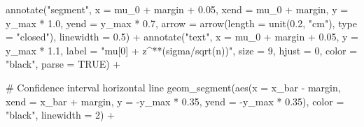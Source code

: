 \documentclass[
  letterpaper,
  DIV=11,
  numbers=noendperiod]{scrreprt}
\newenvironment{Shaded}{\begin{snugshade}}{\end{snugshade}}
\newcommand{\AttributeTok}[1]{\textcolor[rgb]{0.40,0.45,0.13}{#1}}
\newcommand{\CommentTok}[1]{\textcolor[rgb]{0.37,0.37,0.37}{#1}}
\newcommand{\ConstantTok}[1]{\textcolor[rgb]{0.56,0.35,0.01}{#1}}
\newcommand{\DecValTok}[1]{\textcolor[rgb]{0.68,0.00,0.00}{#1}}
\newcommand{\FloatTok}[1]{\textcolor[rgb]{0.68,0.00,0.00}{#1}}
\newcommand{\FunctionTok}[1]{\textcolor[rgb]{0.28,0.35,0.67}{#1}}
\newcommand{\NormalTok}[1]{\textcolor[rgb]{0.00,0.23,0.31}{#1}}
\newcommand{\SpecialCharTok}[1]{\textcolor[rgb]{0.37,0.37,0.37}{#1}}
\newcommand{\StringTok}[1]{\textcolor[rgb]{0.13,0.47,0.30}{#1}}
\begin{document}
\begin{Shaded}
\begin{Highlighting}[]
  \FunctionTok{annotate}\NormalTok{(}\StringTok{"segment"}\NormalTok{, }\AttributeTok{x =}\NormalTok{ mu\_0 }\SpecialCharTok{+}\NormalTok{ margin }\SpecialCharTok{+} \FloatTok{0.05}\NormalTok{, }\AttributeTok{xend =}\NormalTok{ mu\_0 }\SpecialCharTok{+}\NormalTok{ margin, }
           \AttributeTok{y =}\NormalTok{ y\_max }\SpecialCharTok{*} \FloatTok{1.0}\NormalTok{, }\AttributeTok{yend =}\NormalTok{ y\_max }\SpecialCharTok{*} \FloatTok{0.7}\NormalTok{,}
           \AttributeTok{arrow =} \FunctionTok{arrow}\NormalTok{(}\AttributeTok{length =} \FunctionTok{unit}\NormalTok{(}\FloatTok{0.2}\NormalTok{, }\StringTok{"cm"}\NormalTok{), }\AttributeTok{type =} \StringTok{"closed"}\NormalTok{),}
           \AttributeTok{linewidth =} \FloatTok{0.5}\NormalTok{) }\SpecialCharTok{+}
  \FunctionTok{annotate}\NormalTok{(}\StringTok{"text"}\NormalTok{, }\AttributeTok{x =}\NormalTok{ mu\_0 }\SpecialCharTok{+}\NormalTok{ margin }\SpecialCharTok{+} \FloatTok{0.05}\NormalTok{, }\AttributeTok{y =}\NormalTok{ y\_max }\SpecialCharTok{*} \FloatTok{1.1}\NormalTok{, }
           \AttributeTok{label =} \StringTok{"mu[0] + z\^{}\textquotesingle{}*\textquotesingle{}*(sigma/sqrt(n))"}\NormalTok{,}
           \AttributeTok{size =} \DecValTok{9}\NormalTok{, }\AttributeTok{hjust =} \DecValTok{0}\NormalTok{, }\AttributeTok{color =} \StringTok{"black"}\NormalTok{, }\AttributeTok{parse =} \ConstantTok{TRUE}\NormalTok{) }\SpecialCharTok{+}
  
  \CommentTok{\# Confidence interval horizontal line}
  \FunctionTok{geom\_segment}\NormalTok{(}\FunctionTok{aes}\NormalTok{(}\AttributeTok{x =}\NormalTok{ x\_bar }\SpecialCharTok{{-}}\NormalTok{ margin, }\AttributeTok{xend =}\NormalTok{ x\_bar }\SpecialCharTok{+}\NormalTok{ margin, }
                   \AttributeTok{y =} \SpecialCharTok{{-}}\NormalTok{y\_max }\SpecialCharTok{*} \FloatTok{0.35}\NormalTok{, }\AttributeTok{yend =} \SpecialCharTok{{-}}\NormalTok{y\_max }\SpecialCharTok{*} \FloatTok{0.35}\NormalTok{),}
               \AttributeTok{color =} \StringTok{"black"}\NormalTok{, }\AttributeTok{linewidth =} \DecValTok{2}\NormalTok{) }\SpecialCharTok{+}
  

\end{Highlighting}
\end{Shaded}
\end{document}

